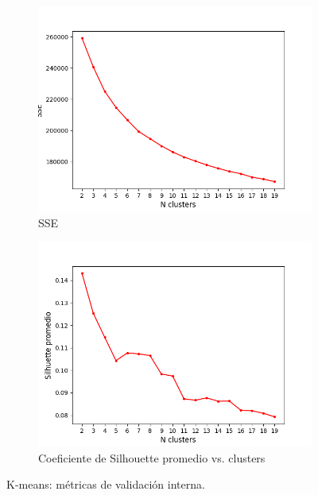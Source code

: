 \documentclass{article}
\begin{document}
\begin{figure} [!htb]
	\centering
	\begin{subfigure}[b]{0.45\textwidth}
		\includegraphics[width= \textwidth]{fg/kmeans_sse (1).png}
        \caption{SSE}
		\label{fg_kmeans_valint_sse}
	\end{subfigure}
	\begin{subfigure}[b]{0.45\textwidth}
		\includegraphics[width= \textwidth]{fg/kmeans_silhouette (2).png}
        \caption{Coeficiente de Silhouette promedio vs. clusters}
        \label{fg_kmeans_valint_silhoutte}
	\end{subfigure}
	\caption{K-means: métricas de validación interna.}	
\end{figure}
\end{document}
